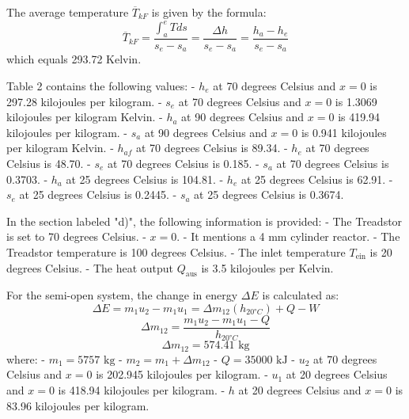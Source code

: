 The average temperature \( \overline{T}_{kF} \) is given by the formula:
\[
\overline{T}_{kF} = \frac{\int_{a}^{e} T ds}{s_e - s_a} = \frac{\Delta h}{s_e - s_a} = \frac{h_a - h_e}{s_e - s_a}
\]
which equals 293.72 Kelvin.

Table 2 contains the following values:
- \( h_e \) at 70 degrees Celsius and \( x=0 \) is 297.28 kilojoules per kilogram.
- \( s_e \) at 70 degrees Celsius and \( x=0 \) is 1.3069 kilojoules per kilogram Kelvin.
- \( h_a \) at 90 degrees Celsius and \( x=0 \) is 419.94 kilojoules per kilogram.
- \( s_a \) at 90 degrees Celsius and \( x=0 \) is 0.941 kilojoules per kilogram Kelvin.
- \( h_{af} \) at 70 degrees Celsius is 89.34.
- \( h_e \) at 70 degrees Celsius is 48.70.
- \( s_e \) at 70 degrees Celsius is 0.185.
- \( s_a \) at 70 degrees Celsius is 0.3703.
- \( h_a \) at 25 degrees Celsius is 104.81.
- \( h_e \) at 25 degrees Celsius is 62.91.
- \( s_e \) at 25 degrees Celsius is 0.2445.
- \( s_a \) at 25 degrees Celsius is 0.3674.

In the section labeled "d)", the following information is provided:
- The Treadstor is set to 70 degrees Celsius.
- \( x = 0 \).
- It mentions a 4 mm cylinder reactor.
- The Treadstor temperature is 100 degrees Celsius.
- The inlet temperature \( T_{\text{ein}} \) is 20 degrees Celsius.
- The heat output \( Q_{\text{aus}} \) is 3.5 kilojoules per Kelvin.

For the semi-open system, the change in energy \( \Delta E \) is calculated as:
\[
\Delta E = m_1 u_2 - m_1 u_1 = \Delta m_{12} \left( h_{20°C} \right) + Q - W
\]
\[
\Delta m_{12} = \frac{m_1 u_2 - m_1 u_1 - Q}{h_{20°C}}
\]
\[
\Delta m_{12} = 574.41 \text{ kg}
\]
where:
- \( m_1 = 5757 \text{ kg} \)
- \( m_2 = m_1 + \Delta m_{12} \)
- \( Q = 35000 \text{ kJ} \)
- \( u_2 \) at 70 degrees Celsius and \( x = 0 \) is 202.945 kilojoules per kilogram.
- \( u_1 \) at 20 degrees Celsius and \( x = 0 \) is 418.94 kilojoules per kilogram.
- \( h \) at 20 degrees Celsius and \( x = 0 \) is 83.96 kilojoules per kilogram.